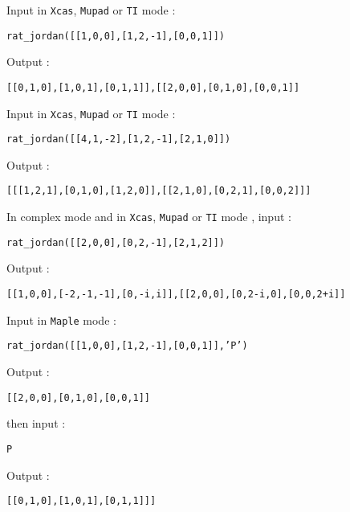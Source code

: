 \documentclass[a4paper,11pt]{book}
\begin{document}
Input in {\tt Xcas}, {\tt Mupad} or {\tt TI} mode :
\begin{center}{\tt rat\_jordan([[1,0,0],[1,2,-1],[0,0,1]])}\end{center}
Output :
\begin{center}{\tt [[0,1,0],[1,0,1],[0,1,1]],[[2,0,0],[0,1,0],[0,0,1]]}\end{center}
Input in {\tt Xcas}, {\tt Mupad} or {\tt TI} mode :
\begin{center}{\tt rat\_jordan([[4,1,-2],[1,2,-1],[2,1,0]])}\end{center}
Output :
\begin{center}{\tt  [[[1,2,1],[0,1,0],[1,2,0]],[[2,1,0],[0,2,1],[0,0,2]]]}\end{center}
In complex mode and in {\tt Xcas}, {\tt Mupad} or {\tt TI} mode , input :
\begin{center}{\tt rat\_jordan([[2,0,0],[0,2,-1],[2,1,2]])}\end{center}
Output :
\begin{center}{\tt [[1,0,0],[-2,-1,-1],[0,-i,i]],[[2,0,0],[0,2-i,0],[0,0,2+i]]}\end{center}
Input  in {\tt Maple} mode :
\begin{center}{\tt rat\_jordan([[1,0,0],[1,2,-1],[0,0,1]],'P')}\end{center}
Output :
\begin{center}{\tt [[2,0,0],[0,1,0],[0,0,1]]}\end{center}
then input : 
\begin{center}{\tt P}\end{center}
Output :
\begin{center}{\tt [[0,1,0],[1,0,1],[0,1,1]]]}\end{center}
\end{document}
